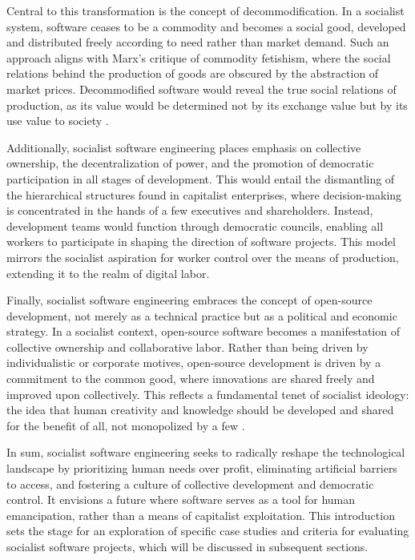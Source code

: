 \begin{refsection}
Central to this transformation is the concept of decommodification. In a socialist system, software ceases to be a commodity and becomes a social good, developed and distributed freely according to need rather than market demand. Such an approach aligns with Marx’s critique of commodity fetishism, where the social relations behind the production of goods are obscured by the abstraction of market prices. Decommodified software would reveal the true social relations of production, as its value would be determined not by its exchange value but by its use value to society \cite[pp.~319]{marx2}. 

Additionally, socialist software engineering places emphasis on collective ownership, the decentralization of power, and the promotion of democratic participation in all stages of development. This would entail the dismantling of the hierarchical structures found in capitalist enterprises, where decision-making is concentrated in the hands of a few executives and shareholders. Instead, development teams would function through democratic councils, enabling all workers to participate in shaping the direction of software projects. This model mirrors the socialist aspiration for worker control over the means of production, extending it to the realm of digital labor.

Finally, socialist software engineering embraces the concept of open-source development, not merely as a technical practice but as a political and economic strategy. In a socialist context, open-source software becomes a manifestation of collective ownership and collaborative labor. Rather than being driven by individualistic or corporate motives, open-source development is driven by a commitment to the common good, where innovations are shared freely and improved upon collectively. This reflects a fundamental tenet of socialist ideology: the idea that human creativity and knowledge should be developed and shared for the benefit of all, not monopolized by a few \cite[pp.~450]{stallman}.

In sum, socialist software engineering seeks to radically reshape the technological landscape by prioritizing human needs over profit, eliminating artificial barriers to access, and fostering a culture of collective development and democratic control. It envisions a future where software serves as a tool for human emancipation, rather than a means of capitalist exploitation. This introduction sets the stage for an exploration of specific case studies and criteria for evaluating socialist software projects, which will be discussed in subsequent sections.


\end{refsection}
